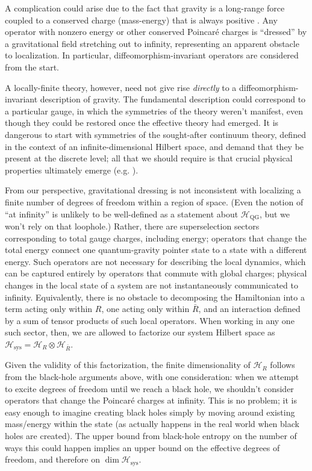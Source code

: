 \documentclass[12pt,english]{article}
\newcommand{\QG}{\mathrm{QG}}
\newcommand{\sys}{\mathrm{sys}}
\newcommand{\HH}{\mathcal{H}}
\begin{document}
A complication could arise due to the fact that gravity is a long-range force coupled to a conserved charge (mass-energy) that is always positive \cite{marolf2015,giddings2015, donnelly+giddings2016_1, donnelly+giddings2016_2}.
Any operator with nonzero energy or other conserved Poincar\'e charges is ``dressed'' by a gravitational field stretching out to infinity, representing an apparent obstacle to localization. 
In particular, diffeomorphism-invariant operators are considered from the start.

A locally-finite theory, however, need not give rise \emph{directly} to a diffeomorphism-invariant description of gravity.
The fundamental description could correspond to a particular gauge, in which the symmetries of the theory weren't manifest, even though they could be restored once the effective theory had emerged.
It is dangerous to start with symmetries of the sought-after continuum theory, defined in the context of an infinite-dimensional Hilbert space, and demand that they be present at the discrete level; all that we should require is that crucial physical properties ultimately emerge (e.g. \cite{Barcelo:2016xhp}).

From our perspective, gravitational dressing is not inconsistent with localizing a finite number of degrees of freedom within a region of space.
(Even the notion of ``at infinity'' is unlikely to be well-defined as a statement about $\HH_\QG$, but we won't rely on that loophole.)
Rather, there are superselection sectors corresponding to total gauge charges, including energy; operators that change the total energy connect one quantum-gravity pointer state to a state with a different energy.
Such operators are not necessary for describing the local dynamics, which can be captured entirely by operators that commute with global charges; physical changes in the local state of a system are not instantaneously communicated to infinity.
Equivalently, there is no obstacle to decomposing the Hamiltonian into a term acting only within $R$, one acting only within $\bar R$, and an interaction defined by a sum of tensor products of such local operators.
When working in any one such sector, then, we are allowed to factorize our system Hilbert space as $\HH_\sys = \HH_R \otimes \HH_{\bar R}$.

Given the validity of this factorization, the finite dimensionality of $\HH_R$ follows from the black-hole arguments above, with one  consideration: when we attempt to excite degrees of freedom until we reach a black hole, we shouldn't consider operators that change the Poincar\'e charges at infinity.
This is no problem; it is easy enough to imagine creating black holes simply by moving around existing mass/energy within the state (as actually happens in the real world when black holes are created).
The upper bound from black-hole entropy on the number of ways this could happen implies an upper bound on the effective degrees of freedom, and therefore on $\dim \HH_\sys$.
 
\end{document}

